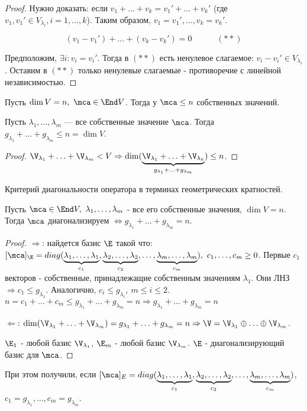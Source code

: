\documentclass[main]{subfiles}
\begin{document}
\begin{proof}
    Нужно доказать: если $v_1 + \ldots + v_k = v_1' + \ldots + v_k'$
    (где $v_1, v_1' \in V_{\lambda_i}, i = 1, \ldots, k$). 
    Таким образом, $v_1 = v_1', \ldots, v_k = v_k'$. 
    
        \[(v_1 - v_1') + \ldots + (v_k - v_k') = 0 \quad \quad \quad (**)\]
    
    Предположим, $\exists i : v_i = v_i'$. Тогда в $(**)$  есть ненулевое слагаемое:
    $v_i - v_i' \in V_{\lambda_i}$. Оставим в $(**)$ только ненулевые 
    слагаемые  - противоречие с линейной независимостью.
\end{proof}

\begin{corollary}
    Пусть $\dim V = n,\ \mca \in \End V$. Тогда у  $\mca \le n$ собственных значений.
\end{corollary}

\begin{corollary}
    Пусть $\lambda_1, \ldots, \lambda_m$ — все собственные значение $\mca$. 
    Тогда $g_{\lambda_1} + \ldots + g_{\lambda_m} \le n = \dim V$.
\end{corollary}

\begin{proof}
    $\V_{\lambda_1} + \ldots + \V_{\lambda_m} < V 
    \Rightarrow \dim (\underbrace{\V_{\lambda_1} + \ldots + \V_{\lambda_k}}_{g_{\lambda_1} + \ldots + g_{\lambda_m}}) \leq n$.
\end{proof}

\begin{proposition}
    Критерий диагональности оператора в терминах геометрических кратностей.

    Пусть $\mca \in \End V,\ \lambda_1, \ldots, \lambda_m$ - все его собственные значения, 
    $\dim V = n$. Тогда $\mca$  диагонализируем $\Leftrightarrow
    g_{\lambda_1} + \ldots +  g_{\lambda_m} = n$.
\end{proposition}

\begin{proof}
    $\Rightarrow$: найдется базис $\E$ такой что: 
    $[\mca]_\E = diag(\underbrace{\lambda_1, \ldots, \lambda_1}_{c_1},
    \underbrace{\lambda_2, \ldots, \lambda_2}_{c_2}, \ldots,
    \underbrace{\lambda_m, \ldots, \lambda_m}_{c_m}), \  c_1, \ldots, c_m \geq 0$.
    Первые $c_1$  векторов - собственные, принадлежащие собственным значениям 
    $\lambda_1$. Они ЛНЗ $\Rightarrow c_1 \leq g_{\lambda_1}$.
    Аналогично, $c_i \leq g_{\lambda_i},\ m \leq i \leq 2$.
    $n = c_1 + \ldots + c_m \leq g_{\lambda_1} + \ldots + g_{\lambda_m} = n
    \Rightarrow g_{\lambda_1} + \ldots + g_{\lambda_m} = n$

    $\Leftarrow$: $\dim (\V_{\lambda_1} + \ldots + \V_{\lambda_m}) =
    g_{\lambda_1} + \ldots + g_{\lambda_m} = n \Rightarrow
    \V = \V_{\lambda_1} \oplus \ldots \oplus  \V_{\lambda_m}$.

    $\E_1$ - любой базис $\V_{\lambda_1}$,  
    $\E_m$ - любой базис $\V_{\lambda_m}$. 
    $\E$ - диагонализирующий базис для $\mca$.
\end{proof}

\begin{remark}
    При этом получили, если $[\mca]_E = diag(\underbrace{\lambda_1, \ldots, \lambda_1}_{c_1},
    \underbrace{\lambda_2, \ldots, \lambda_2}_{c_2}, \ldots,
    \underbrace{\lambda_m, \ldots, \lambda_m}_{c_m})$,
    $c_1 = g_{\lambda_1}, \ldots,c_m = g_{\lambda_m}$.
\end{remark}
\end{document}
